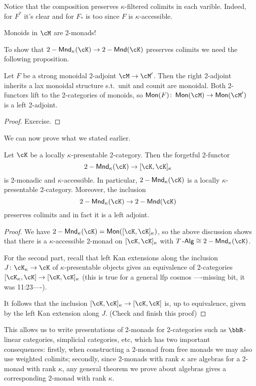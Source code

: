 \documentclass[a4paper,11pt,oneside,openany]{scrbook}
\begin{document}
Notice that the composition preserves $\kappa$-filtered colimits in each
varible. Indeed, for $F^*$ it's clear and for $F_*$ is too since $F$ is
$\kappa$-accessible.

Monoids in $\cM$ are 2-monads!

To show that $2-\Mnd_\kappa(\cK)\rightarrow 2-\Mnd(\cK)$ preserves colimits we
need the following proposition.

\begin{prop}
    Let $F$ be a strong monoidal 2-adjoint $\cM\rightarrow\cM'$. Then the right
    2-adjoint inherits a lax monoidal structure s.t.\ unit and counit are
    monoidal. Both 2-functors lift to the 2-categories of monoids, so
    $\Mon(F)\colon\Mon(\cM)\rightarrow\Mon(\cM')$ is a left 2-adjoint.
\end{prop}
\begin{proof}
    Exercise.
\end{proof}

We can now prove what we stated earlier.

\begin{thm}
    Let $\cK$ be a locally $\kappa$-presentable 2-category. Then the forgetful
    2-functor
    \[
        2-\Mnd_\kappa(\cK)\rightarrow[\cK,\cK]_\kappa
    \]
    is 2-monadic and $\kappa$-accessible. In particular, $2-\Mnd_\kappa(\cK)$ is
    a locally $\kappa$-presentable 2-category.
    Moreover, the inclusion
    \[
        2-\Mnd_\kappa(\cK)\rightarrow 2-\Mnd(\cK)
    \]
    preserves colimits and in fact it is a left adjoint.
\end{thm}
\begin{proof}
    We have $2-\Mnd_\kappa(\cK)=\Mon([\cK,\cK]_\kappa)$, so the above discussion
    shows that there is a $\kappa$-accessible 2-monad on $[\cK,\cK]_\kappa$ with
    $T\Alg\cong 2-\Mnd_\kappa(\cK)$.

    For the second part, recall that left Kan extensions along the inclusion
    $J\colon\cK_\kappa\rightarrow\cK$ of $\kappa$-presentable objects gives an
    equivalence of 2-categories $[\cK_\kappa,\cK]\rightarrow[\cK,\cK]_\kappa$
    (this is true for a general lfp cosmos ----missing bit, it was 11:23----).

    It follows that the inclusion $[\cK,\cK]_\kappa\rightarrow[\cK,\cK]$ is, up
    to equivalence, given by the left Kan extension along $J$. (Check and finish
    this proof)
\end{proof}

This allows us to write presentations of 2-monads for 2-categories such as
$\bbR$-linear categories, simplicial categories, etc, which has two important
consequences: firstly, when constructing a 2-monad from free monads we may also
use weighted colimits; secondly, since 2-monads with rank $\kappa$ are algebras
for a 2-monad with rank $\kappa$, any general theorem we prove about algebras
gives a corresponding 2-monad with rank $\kappa$.
\end{document}
